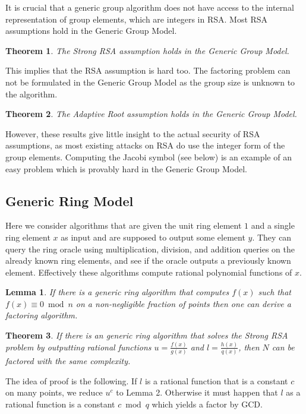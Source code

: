 \documentclass[a4paper]{article}
\newtheorem{theorem}{Theorem}
\newtheorem{lemma}{Lemma}
\begin{document}
It is crucial that a generic group algorithm does not have access to the internal representation of group elements, which are integers in RSA. 
Most RSA assumptions hold in the Generic Group Model. 
\begin{theorem}\cite{DBLP:conf/eurocrypt/DamgardK02}
The Strong RSA assumption holds in the Generic Group Model.
\end{theorem}
This implies that the RSA assumption is hard too. The factoring problem can not be formulated in the Generic Group Model as the group size is unknown to the algorithm.
\begin{theorem}\cite{cryptoeprint:2019:1229}
The Adaptive Root assumption holds in the Generic Group Model.
\end{theorem}
However, these results give little insight to the actual security of RSA assumptions, as most existing attacks on RSA do use the integer form of the group elements. Computing the Jacobi symbol (see below) is an example of an easy problem which is provably hard in the Generic Group Model.

\subsection{Generic Ring Model}

Here we consider algorithms that are given the unit ring element $1$ and a single ring element $x$ as input and are supposed to output some element $y$. They can query the ring oracle using multiplication, division, and addition queries on the already known ring elements, and see if the oracle outputs a previously known element. Effectively these algorithms compute rational polynomial functions of $x$.

\begin{lemma}\cite{DBLP:conf/eurocrypt/AggarwalM09}
If there is a generic ring algorithm that computes $f(x)$ such that $f(x)\equiv 0 \bmod{n}$ on a non-negligible fraction of points then one can derive a factoring algorithm.
\end{lemma}

\begin{theorem}\cite{aggarwal2011equivalence}
If there is an generic ring algorithm that solves the Strong RSA problem by outputting rational functions $u=\frac{f(x)}{g(x)}$ and $l=\frac{h(x)}{q(x)}$, then $N$ can be factored with the same complexity.
\end{theorem}
The idea of proof is the following. If $l$ is a rational function that is a constant $c$ on many points, we reduce $u^c$ to Lemma 2. Otherwise it must happen that $l$ as a rational function is a constant $c\bmod{q}$ which yields a factor by GCD.
\end{document}
